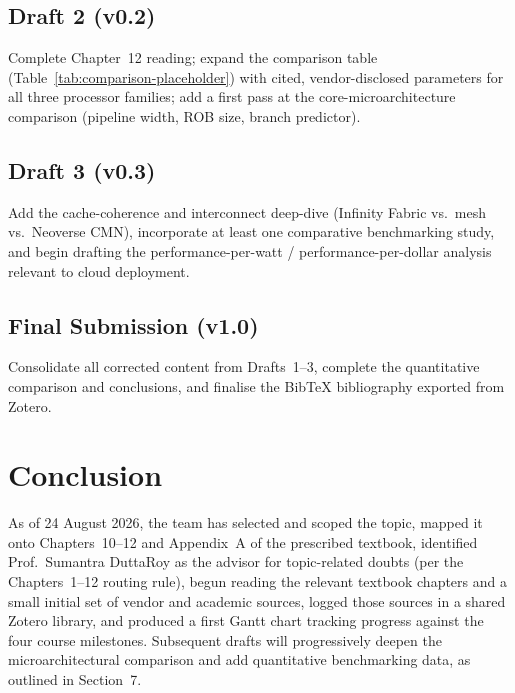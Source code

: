 \documentclass[11pt,a4paper]{article}
\begin{document}
\subsection{Draft 2 (v0.2)}
Complete Chapter~12 reading; expand the comparison table
(Table~\ref{tab:comparison-placeholder}) with cited, vendor-disclosed parameters for all
three processor families; add a first pass at the core-microarchitecture comparison
(pipeline width, ROB size, branch predictor).

\subsection{Draft 3 (v0.3)}
Add the cache-coherence and interconnect deep-dive (Infinity Fabric vs.\ mesh vs.\ Neoverse
CMN), incorporate at least one comparative benchmarking study, and begin drafting the
performance-per-watt / performance-per-dollar analysis relevant to cloud deployment.

\subsection{Final Submission (v1.0)}
Consolidate all corrected content from Drafts~1--3, complete the quantitative comparison and
conclusions, and finalise the BibTeX bibliography exported from Zotero.

\section{Conclusion}

As of 24 August 2026, the team has selected and scoped the topic, mapped it onto
Chapters~10--12 and Appendix~A of the prescribed textbook, identified Prof.\ Sumantra
DuttaRoy as the advisor for topic-related doubts (per the Chapters~1--12 routing rule), begun
reading the relevant textbook chapters and a small initial set of vendor and academic sources,
logged those sources in a shared Zotero library, and produced a first Gantt chart tracking
progress against the four course milestones. Subsequent drafts will progressively deepen the
microarchitectural comparison and add quantitative benchmarking data, as outlined in
Section~7.
\end{document}
